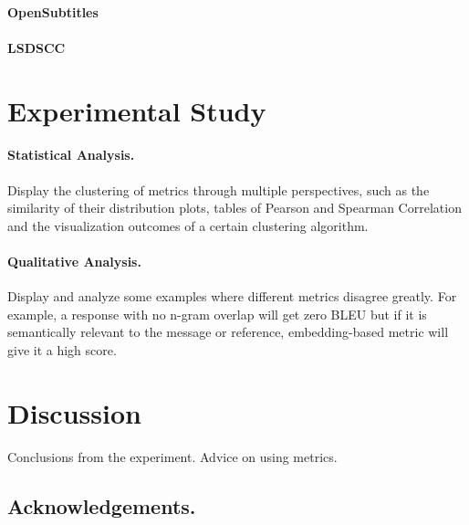 \documentclass[runningheads]{llncs}
\begin{document}
    \paragraph{OpenSubtitles}
    \paragraph{LSDSCC}


    \section{Experimental Study}
    \paragraph{Statistical Analysis.}
    Display the clustering of metrics through multiple perspectives,
    such as the similarity of their distribution plots, tables of Pearson and Spearman Correlation
    and the visualization outcomes of a certain clustering algorithm.

    \paragraph{Qualitative Analysis.}
    Display and analyze some examples where different metrics disagree greatly.
    For example, a response with no n-gram overlap will get zero BLEU but if it is semantically
    relevant to the message or reference, embedding-based metric will give it a high score.

    \section{Discussion}
    Conclusions from the experiment.
    Advice on using metrics.

    \subsection*{Acknowledgements.}

    
    
\end{document}
